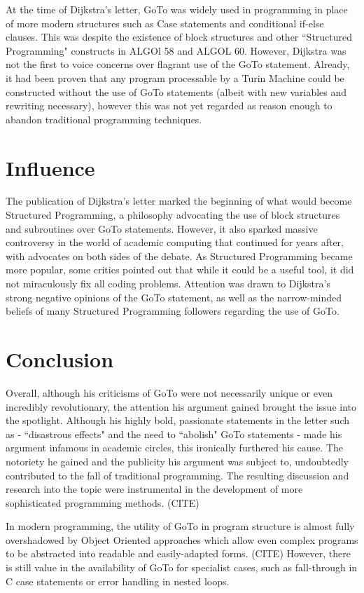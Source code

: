 \documentclass{scrartcl}
\begin{document}
At the time of Dijkstra's letter, GoTo was widely used in programming in place of more modern structures such as Case statements and conditional if-else clauses. This was despite the existence of block structures and other ``Structured Programming" constructs in ALGOl 58 and ALGOL 60. \cite{algoldev} However, Dijkstra was not the first to voice concerns over flagrant use of the GoTo statement. Already, it had been proven that any program processable by a Turin Machine could be constructed without the use of GoTo statements (albeit with new variables and rewriting necessary), \cite{structuretheorem} however this was not yet regarded as reason enough to abandon traditional programming techniques.



\section{Influence}

The publication of Dijkstra's letter marked the beginning of what would become Structured Programming, a philosophy advocating the use of block structures and subroutines over GoTo statements. However, it also sparked massive controversy in the world of academic computing that continued for years after, with advocates on both sides of the debate. \cite{dijkstraharmful} \cite{compromise} \cite{structuredharmful} As Structured Programming became more popular, some critics pointed out that while it could be a useful tool, it did not miraculously fix all coding problems. Attention was drawn to Dijkstra's strong negative opinions of the GoTo statement, as well as the narrow-minded beliefs of many Structured Programming followers regarding the use of GoTo. \cite{structuredharmful}

\section{Conclusion}

Overall, although his criticisms of GoTo were not necessarily unique or even incredibly revolutionary, the attention his argument gained brought the issue into the spotlight. Although his highly bold, passionate statements in the letter such as - ``disastrous effects" and the need to ``abolish" GoTo statements \cite[p. ~147]{dijkstragoto} -  made his argument infamous in academic circles, this ironically furthered his cause. The notoriety he gained and the publicity his argument was subject to, undoubtedly contributed to the fall of traditional programming. The resulting discussion and research into the topic were instrumental in the development of more sophisticated programming methods. (CITE)

In modern programming, the utility of GoTo in program structure is almost fully overshadowed by Object Oriented approaches which allow even complex programs to be abstracted into readable and easily-adapted forms. (CITE) However, there is still value in the availability of GoTo for specialist cases, such as fall-through in C case statements or error handling in nested loops. \cite{useofgoto}



\end{document}
